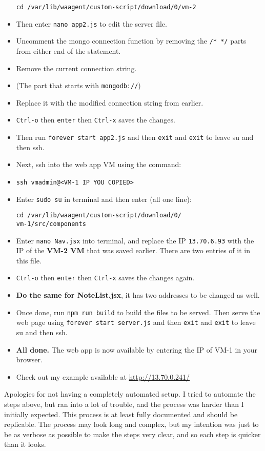 \documentclass[12pt]{extarticle}
\begin{document}
\begin{itemize}
  \texttt{cd\ /var/lib/waagent/custom-script/download/0/vm-2}
\item
  Then enter \texttt{nano\ app2.js} to edit the server file.
\item
  Uncomment the mongo connection function by removing the
  \texttt{/*\ */} parts from either end of the statement.
\item
  Remove the current connection string.
  \item (The part that starts with \texttt{mongodb://})
\item
  Replace it with the modified connection string from earlier.
\item
  \texttt{Ctrl-o} then \texttt{enter} then \texttt{Ctrl-x} saves the
  changes.
\item
  Then run \texttt{forever\ start\ app2.js} and then \texttt{exit} and
  \texttt{exit} to leave su and then ssh.
\item
  Next, ssh into the web app VM using the command:
\item \texttt{ssh\ vmadmin@<VM-1\ IP\ YOU\ COPIED>}
\item
  Enter \texttt{sudo\ su} in terminal and then enter (all one line):
  \begin{lstlisting}
cd /var/lib/waagent/custom-script/download/0/
vm-1/src/components
     	\end{lstlisting}
\item
  Enter \texttt{nano\ Nav.jsx} into terminal, and replace the IP
  \texttt{13.70.6.93} with the IP of the \textbf{VM-2 VM} that was saved
  earlier. There are two entries of it in this file.
\item
  \texttt{Ctrl-o} then \texttt{enter} then \texttt{Ctrl-x} saves the
  changes again.
\item
  \textbf{Do the same for NoteList.jsx}, it has two addresses to be
  changed as well.
\item
  Once done, run \texttt{npm\ run\ build} to build the files to be
  served. Then serve the web page using
  \texttt{forever\ start\ server.js} and then \texttt{exit} and
  \texttt{exit} to leave su and then ssh.
\item
  \textbf{All done.} The web app is now available by entering the IP of
  VM-1 in your browser.
\item
  Check out my example available at \url{http://13.70.0.241/}
\end{itemize}

Apologies for not having a completely automated setup. I tried to automate the steps above, but ran into a lot of trouble, and the process was harder than I initially expected. This process is at least fully documented and should be replicable. The process may look long and complex, but my intention was just to be as verbose as possible to make the steps very clear, and so each step is quicker than it looks.
\end{document}
